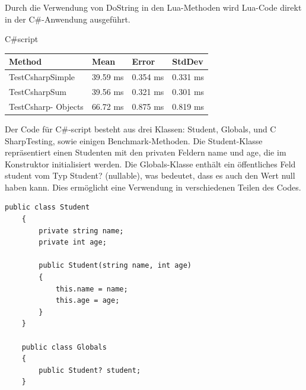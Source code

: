Durch die Verwendung von DoString in den Lua-Methoden wird Lua-Code direkt in der C\#-Anwendung ausgeführt.

\newpage
C\#script
        \begin{table}[H]
            \begin{tabular}{|p{3.5cm}|p{3cm}|p{3cm}|p{3cm}|}
            \hline
                Method & Mean & Error & StdDev \\ \hline
                TestCsharpSimple & 39.59 ms & 0.354 ms & 0.331 ms \\ \hline
                TestCsharpSum & 39.56 ms & 0.321 ms & 0.301 ms \\ \hline
                TestCsharp-
                Objects & 66.72 ms & 0.875 ms & 0.819 ms \\ \hline
            \end{tabular}
        \end{table}

Der Code für C\#-script besteht aus drei Klassen: Student, Globals, und C \textunderscore SharpTesting, sowie einigen Benchmark-Methoden.
Die Student-Klasse repräsentiert einen Studenten mit den privaten Feldern name und age, die im Konstruktor initialisiert werden.
Die Globals-Klasse enthält ein öffentliches Feld student vom Typ Student? (nullable), was bedeutet, dass es auch den Wert null haben kann. Dies ermöglicht eine Verwendung in verschiedenen Teilen des Codes.

\begin{lstlisting}[language={[Sharp]C}, caption=C\#Scripting Klassen, label=lst:imp:cscm]
    public class Student
    {       
        private string name;
        private int age;

        public Student(string name, int age)
        {
            this.name = name;
            this.age = age;
        }
    }

    public class Globals
    {
        public Student? student;
    }
\end{lstlisting}


